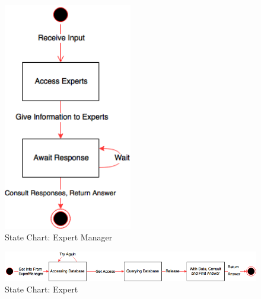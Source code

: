 \documentclass[]{article}
\begin{document}
\begin{figure}[H]
	\begin{center}
	\includegraphics[width=0.5\textwidth]{images/ExpertManager.png}
	\caption{State Chart: Expert Manager}
	\end{center}
\end{figure}
\begin{figure}[H]
	\includegraphics[width=\textwidth]{images/Expert.png}
	\caption{State Chart: Expert}
\end{figure}
\end{document}
